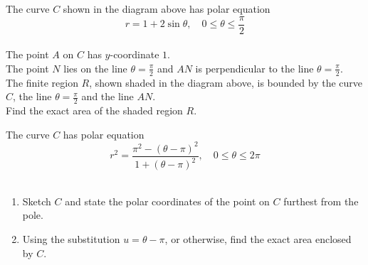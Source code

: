 \documentclass[leqno]{article}
\begin{document}
\begin{enumerate}[
  label=\textbf{\arabic*.},
  leftmargin=*,
  topsep=0pt,
  partopsep=0pt,
  parsep=0pt
]
\begin{figure}[H]
\end{figure}


The curve $C$ shown in the diagram above has polar equation
\[
r=1+2\sin\theta,\quad 0\leq\theta\leq\frac{\pi}{2}
\] \\
The point $A$ on $C$ has $y$-coordinate $1$. \\

The point $N$ lies on the line $\theta=\frac{\pi}{2}$ and $AN$ is perpendicular to the line $\theta=\frac{\pi}{2}$. \\

The finite region $R$, shown shaded in the diagram above, is bounded by the curve $C$, the line $\theta=\frac{\pi}{2}$ and the line $AN$. \\

Find the exact area of the shaded region $R$.  \\


\newpage

\questionitem

The curve $C$ has polar equation
\[
r^2=\frac{\pi^2-(\theta-\pi)^2}{1+(\theta-\pi)^2},\quad 0\leq\theta\leq2\pi
\] \\
\begin{enumerate}[label=\textbf{(\alph*)}]
  \item Sketch $C$ and state the polar coordinates of the point on $C$ furthest from the pole.  \\
  \item Using the substitution $u=\theta-\pi$, or otherwise, find the exact area enclosed by $C$.  \\
\end{enumerate}


\end{enumerate}
\end{document}
